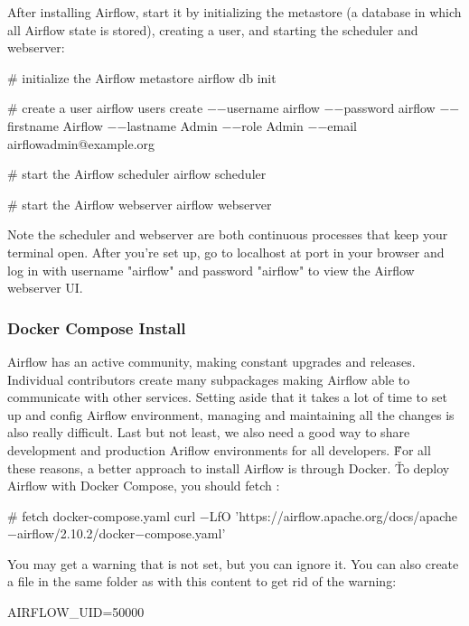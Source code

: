 After installing Airflow, start it by initializing the metastore (a database in which all Airflow state is stored),
creating a user, and starting the scheduler and webserver:
\begin{bash}
# initialize the Airflow metastore
airflow db init
\end{bash}

\begin{bash}
# create a user
airflow users create $-$$-$username airflow $-$$-$password airflow
    $-$$-$firstname Airflow $-$$-$lastname Admin
    $-$$-$role Admin $-$$-$email airflowadmin@example.org
\end{bash}

\begin{bash}
# start the Airflow scheduler
airflow scheduler
\end{bash}

\begin{bash}
# start the Airflow webserver
airflow webserver
\end{bash}

Note the scheduler and webserver are both continuous processes that keep your terminal open. After you're set up, go
to localhost at port  in your browser and log in with username "airflow" and password "airflow" to view
the Airflow webserver UI\@.

\subsubsection{Docker Compose Install}

Airflow has an active community, making constant upgrades and releases. Individual contributors create many
subpackages making Airflow able to communicate with other services. Setting aside that it takes a lot of time to
set up and config Airflow environment, managing and maintaining all the changes is also really difficult. Last but
not least, we also need a good way to share development and production Ariflow environments for all developers. \v

For all these reasons, a better approach to install Airflow is through Docker. \v

To deploy Airflow with Docker Compose, you should fetch :
\begin{bash}
# fetch docker-compose.yaml
curl $-$LfO 'https://airflow.apache.org/docs/apache$-$airflow/2.10.2/docker$-$compose.yaml'
\end{bash}

You may get a warning that  is not set, but you can ignore it. You can also create a  file
in the same folder as  with this content to get rid of the warning:
\begin{block}
AIRFLOW_UID=50000
\end{block}


